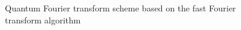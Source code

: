 \begin{figure}
\centering



\caption{Quantum Fourier transform scheme based on the fast Fourier transform algorithm}
\label{figQuantCompQuantFourier}
\end{figure}
